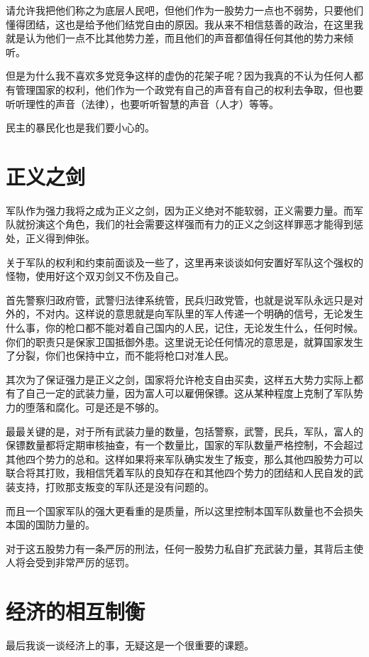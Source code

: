 \documentclass[11pt,oneside]{article}
\begin{document}
\begin{common-format}
请允许我把他们称之为底层人民吧，但他们作为一股势力一点也不弱势，只要他们懂得团结，这也是给予他们结党自由的原因。我从来不相信慈善的政治，在这里我就是认为他们一点不比其他势力差，而且他们的声音都值得任何其他的势力来倾听。

但是为什么我不喜欢多党竞争这样的虚伪的花架子呢？因为我真的不认为任何人都有管理国家的权利，他们作为一个政党有自己的声音有自己的权利去争取，但也要听听理性的声音（法律），也要听听智慧的声音（人才）等等。

民主的暴民化也是我们要小心的。


\section{正义之剑}
军队作为强力我将之成为正义之剑，因为正义绝对不能软弱，正义需要力量。而军队就扮演这个角色，我们的社会需要这样强而有力的正义之剑这样罪恶才能得到惩处，正义得到伸张。

关于军队的权利和约束前面谈及一些了，这里再来谈谈如何安置好军队这个强权的怪物，使用好这个双刃剑又不伤及自己。

首先警察归政府管，武警归法律系统管，民兵归政党管，也就是说军队永远只是对外的，不对内。这样说的意思就是向军队里的军人传递一个明确的信号，无论发生什么事，你的枪口都不能对着自己国内的人民，记住，无论发生什么，任何时候。你们的职责只是保家卫国抵御外患。这里说无论任何情况的意思是，就算国家发生了分裂，你们也保持中立，而不能将枪口对准人民。

其次为了保证强力是正义之剑，国家将允许枪支自由买卖，这样五大势力实际上都有了自己一定的武装力量，因为富人可以雇佣保镖。这从某种程度上克制了军队势力的堕落和腐化。可是还是不够的。


最最关键的是，对于所有武装力量的数量，包括警察，武警，民兵，军队，富人的保镖数量都将定期审核抽查，有一个数量比，国家的军队数量严格控制，不会超过其他四个势力的总和。这样如果将来军队确实发生了叛变，那么其他四股势力可以联合将其打败，我相信凭着军队的良知存在和其他四个势力的团结和人民自发的武装支持，打败那支叛变的军队还是没有问题的。

而且一个国家军队的强大更看重的是质量，所以这里控制本国军队数量也不会损失本国的国防力量的。

对于这五股势力有一条严厉的刑法，任何一股势力私自扩充武装力量，其背后主使人将会受到非常严厉的惩罚。


\section{经济的相互制衡}
最后我谈一谈经济上的事，无疑这是一个很重要的课题。


\end{common-format}
\end{document}
